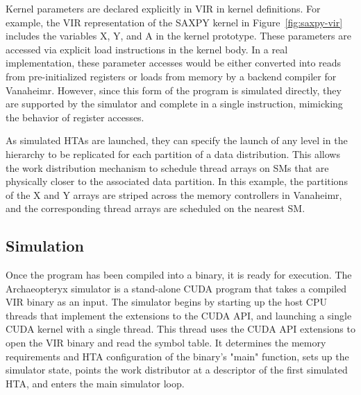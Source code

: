 \documentclass[conference, 10pt]{IEEEtran}
\begin{document}
Kernel parameters are declared explicitly in VIR in kernel definitions. 
For example, the VIR representation of the SAXPY kernel in 
Figure~\ref{fig:saxpy-vir} includes the variables X, Y, and A in the kernel
prototype.  These parameters are accessed via explicit load
instructions in the kernel body. In a real implementation, these parameter
accesses would be either converted into reads from pre-initialized registers or
loads from memory by a backend compiler for Vanaheimr.  However, since this
form of the program is simulated directly, they are supported by the simulator
and complete in a single instruction, mimicking the behavior of register accesses.

As simulated HTAs are launched, they can specify the launch of any level in the
hierarchy to be replicated for each partition of a data distribution.  This
allows the work distribution mechanism to schedule thread arrays on SMs that
are physically closer to the associated data partition.  In this example, the
partitions of the X and Y arrays are striped across the memory controllers in
Vanaheimr, and the corresponding thread arrays are scheduled on the nearest SM.

\subsection{Simulation}

Once the program has been compiled into a binary, it is ready for execution. 
The Archaeopteryx simulator is a stand-alone CUDA program that takes a compiled
VIR binary as an input.  The simulator begins by starting up the host CPU
threads that implement the extensions to the CUDA API, and launching a single
CUDA kernel with a single thread.   This thread uses the CUDA API extensions to
open the VIR binary and read the symbol table.  It determines the memory
requirements and HTA configuration of the binary's "main" function, sets up the
simulator state, points the work distributor at a descriptor of the first
simulated HTA, and enters the main simulator loop.  
\end{document}
